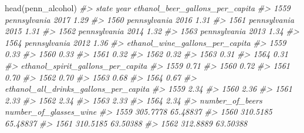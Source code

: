 \documentclass[
]{krantz}
\makeatletter
\newenvironment{Shaded}{\begin{snugshade}}{\end{snugshade}}
\newcommand{\CommentTok}[1]{\textcolor[rgb]{0.37,0.37,0.37}{\textit{#1}}}
\newcommand{\FunctionTok}[1]{\textcolor[rgb]{0,0,0}{#1}}
\newcommand{\NormalTok}[1]{#1}
\newenvironment{kframe}{%
\medskip{}
\setlength{\fboxsep}{.8em}
 \def\at@end@of@kframe{}%
 \ifinner\ifhmode%
  \def\at@end@of@kframe{\end{minipage}}%
  \begin{minipage}{\columnwidth}%
 \fi\fi%
 \def\FrameCommand##1{\hskip\@totalleftmargin \hskip-\fboxsep
 \colorbox{shadecolor}{##1}\hskip-\fboxsep
     \hskip-\linewidth \hskip-\@totalleftmargin \hskip\columnwidth}%
 \MakeFramed {\advance\hsize-\width
   \@totalleftmargin\z@ \linewidth\hsize
   \@setminipage}}%
 {\par\unskip\endMakeFramed%
 \at@end@of@kframe}
\renewenvironment{Shaded}{\begin{kframe}}{\end{kframe}}
\makeatother
\begin{document}
\begin{Shaded}
\begin{Highlighting}[]
\FunctionTok{head}\NormalTok{(penn\_alcohol)}
\CommentTok{\#\textgreater{}             state year ethanol\_beer\_gallons\_per\_capita}
\CommentTok{\#\textgreater{} 1559 pennsylvania 2017                            1.29}
\CommentTok{\#\textgreater{} 1560 pennsylvania 2016                            1.31}
\CommentTok{\#\textgreater{} 1561 pennsylvania 2015                            1.31}
\CommentTok{\#\textgreater{} 1562 pennsylvania 2014                            1.32}
\CommentTok{\#\textgreater{} 1563 pennsylvania 2013                            1.34}
\CommentTok{\#\textgreater{} 1564 pennsylvania 2012                            1.36}
\CommentTok{\#\textgreater{}      ethanol\_wine\_gallons\_per\_capita}
\CommentTok{\#\textgreater{} 1559                            0.33}
\CommentTok{\#\textgreater{} 1560                            0.33}
\CommentTok{\#\textgreater{} 1561                            0.32}
\CommentTok{\#\textgreater{} 1562                            0.32}
\CommentTok{\#\textgreater{} 1563                            0.31}
\CommentTok{\#\textgreater{} 1564                            0.31}
\CommentTok{\#\textgreater{}      ethanol\_spirit\_gallons\_per\_capita}
\CommentTok{\#\textgreater{} 1559                              0.71}
\CommentTok{\#\textgreater{} 1560                              0.72}
\CommentTok{\#\textgreater{} 1561                              0.70}
\CommentTok{\#\textgreater{} 1562                              0.70}
\CommentTok{\#\textgreater{} 1563                              0.68}
\CommentTok{\#\textgreater{} 1564                              0.67}
\CommentTok{\#\textgreater{}      ethanol\_all\_drinks\_gallons\_per\_capita}
\CommentTok{\#\textgreater{} 1559                                  2.34}
\CommentTok{\#\textgreater{} 1560                                  2.36}
\CommentTok{\#\textgreater{} 1561                                  2.33}
\CommentTok{\#\textgreater{} 1562                                  2.34}
\CommentTok{\#\textgreater{} 1563                                  2.33}
\CommentTok{\#\textgreater{} 1564                                  2.34}
\CommentTok{\#\textgreater{}      number\_of\_beers number\_of\_glasses\_wine}
\CommentTok{\#\textgreater{} 1559        305.7778               65.48837}
\CommentTok{\#\textgreater{} 1560        310.5185               65.48837}
\CommentTok{\#\textgreater{} 1561        310.5185               63.50388}
\CommentTok{\#\textgreater{} 1562        312.8889               63.50388}

\end{Highlighting}
\end{Shaded}
\end{document}
